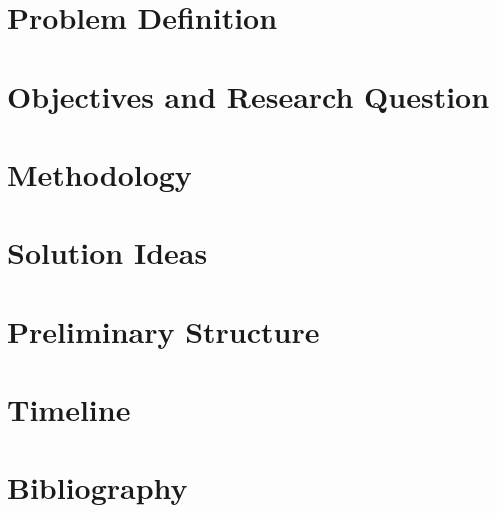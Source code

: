 \chapter{Problem Definition}

\chapter{Objectives and Research Question}

\chapter{Methodology}

\chapter{Solution Ideas}

\chapter{Preliminary Structure}

\chapter{Timeline}

\chapter{Bibliography}